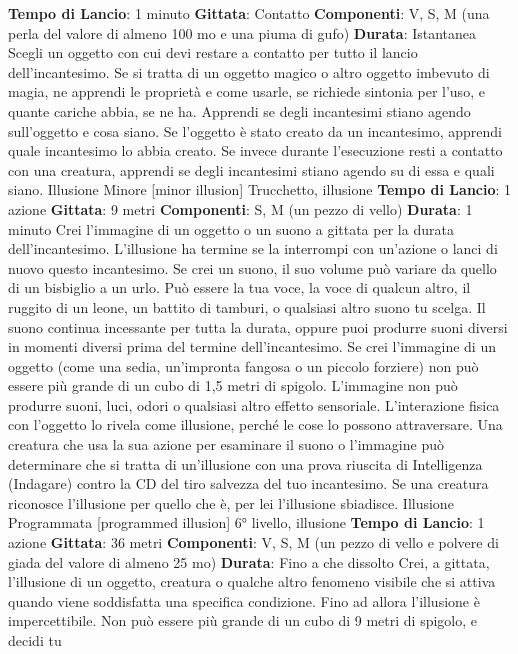 \begin{multicols}{2}
\textbf{Tempo di Lancio}: 1 minuto
\textbf{Gittata}: Contatto
\textbf{Componenti}: V, S, M (una perla del valore di almeno
100 mo e una piuma di gufo)
\textbf{Durata}: Istantanea
Scegli un oggetto con cui devi restare a contatto per
tutto il lancio dell’incantesimo. Se si tratta di un oggetto
magico o altro oggetto imbevuto di magia, ne apprendi
le proprietà e come usarle, se richiede sintonia per
l’uso, e quante cariche abbia, se ne ha. Apprendi se
degli incantesimi stiano agendo sull’oggetto e cosa
siano. Se l’oggetto è stato creato da un incantesimo,
apprendi quale incantesimo lo abbia creato.
Se invece durante l’esecuzione resti a contatto con una
creatura, apprendi se degli incantesimi stiano agendo
su di essa e quali siano.
Illusione Minore
[minor illusion]
Trucchetto, illusione
\textbf{Tempo di Lancio}: 1 azione
\textbf{Gittata}: 9 metri
\textbf{Componenti}: S, M (un pezzo di vello)
\textbf{Durata}: 1 minuto
Crei l’immagine di un oggetto o un suono a gittata per la
durata dell’incantesimo. L’illusione ha termine se la
interrompi con un’azione o lanci di nuovo questo
incantesimo.
Se crei un suono, il suo volume può variare da quello di
un bisbiglio a un urlo. Può essere la tua voce, la voce di
qualcun altro, il ruggito di un leone, un battito di
tamburi, o qualsiasi altro suono tu scelga. Il suono
continua incessante per tutta la durata, oppure puoi
produrre suoni diversi in momenti diversi prima del
termine dell’incantesimo.
Se crei l’immagine di un oggetto (come una sedia,
un’impronta fangosa o un piccolo forziere) non può
essere più grande di un cubo di 1,5 metri di spigolo.
L’immagine non può produrre suoni, luci, odori o
qualsiasi altro effetto sensoriale. L’interazione fisica con
l’oggetto lo rivela come illusione, perché le cose lo
possono attraversare.
Una creatura che usa la sua azione per esaminare il
suono o l’immagine può determinare che si tratta di
un’illusione con una prova riuscita di Intelligenza
(Indagare) contro la CD del tiro salvezza del tuo
incantesimo. Se una creatura riconosce l’illusione per
quello che è, per lei l’illusione sbiadisce.
Illusione Programmata
[programmed illusion]
6° livello, illusione
\textbf{Tempo di Lancio}: 1 azione
\textbf{Gittata}: 36 metri
\textbf{Componenti}: V, S, M (un pezzo di vello e polvere di
giada del valore di almeno 25 mo)
\textbf{Durata}: Fino a che dissolto
Crei, a gittata, l’illusione di un oggetto, creatura o
qualche altro fenomeno visibile che si attiva quando
viene soddisfatta una specifica condizione. Fino ad
allora l’illusione è impercettibile. Non può essere più
grande di un cubo di 9 metri di spigolo, e decidi tu

\end{multicols}
